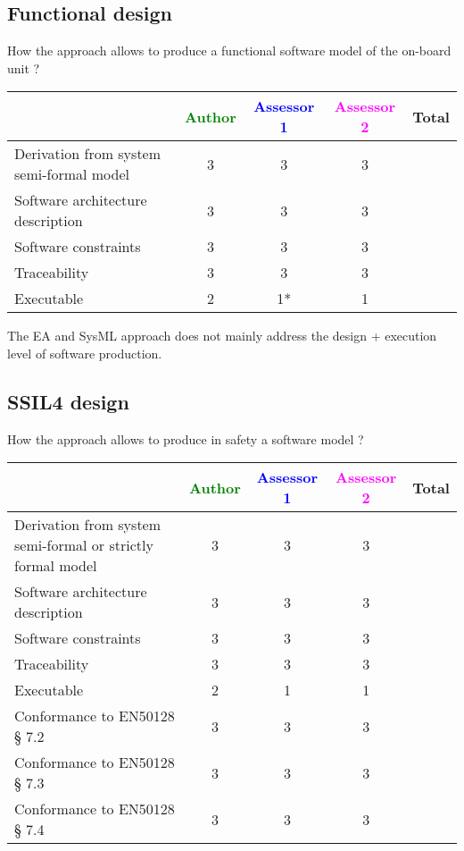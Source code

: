 \subsection{Functional design}

How the approach allows to  produce a functional software model of the on-board unit ?

\begin{tabular}{|l | c | c | c | c|}
\hline
& \textcolor{green}{Author} & \textcolor{blue}{Assessor 1} & \textcolor{magenta}{Assessor 2} & Total \\
\hline
Derivation from system semi-formal model  &3 & 3& 3&  \\
\hline 
Software architecture description  &3 & 3& 3&  \\
\hline
Software constraints  &3 & 3& 3&  \\
\hline
Traceability  &3 & 3&3 &  \\
\hline
Executable  &2 & 1*& 1&  \\
\hline
\end{tabular}

\begin{assessor1}
The EA and SysML approach does not mainly address the design + execution level of software production. 
\end{assessor1}

\subsection{SSIL4 design}

How the approach allows to produce in safety a software model ?

\begin{tabular}{|l | c | c | c | c|}
\hline
& \textcolor{green}{Author} & \textcolor{blue}{Assessor 1} & \textcolor{magenta}{Assessor 2} & Total \\
\hline
Derivation from system semi-formal or strictly formal model  &3 & 3& 3&  \\
\hline 
Software architecture description  &3 & 3& 3&  \\
\hline
Software constraints  &3 & 3& 3&  \\
\hline
Traceability  &3 & 3& 3&  \\
\hline
Executable  &2 & 1& 1&  \\
\hline
Conformance to EN50128 § 7.2  &3 & 3& 3&  \\
\hline
Conformance to EN50128 § 7.3  &3 & 3& 3&  \\
\hline
Conformance to EN50128 § 7.4  & 3& 3& 3&  \\
\hline
\end{tabular}

